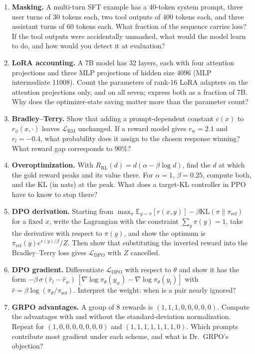 \documentclass[11pt,letterpaper]{article}
\newcommand{\piref}{\pi_{\mathrm{ref}}}
\newcommand{\pit}{\pi_\theta}\newcommand{\KL}{\mathrm{KL}}
\begin{document}
\begin{enumerate}[leftmargin=1.6em,itemsep=6pt]
\item \textbf{Masking.} A multi-turn SFT example has a 40-token system prompt, three user turns of 30 tokens each, two tool outputs of 400 tokens each, and three assistant turns of 60 tokens each. What fraction of the sequence carries loss? If the tool outputs were accidentally unmasked, what would the model learn to do, and how would you detect it at evaluation?
\item \textbf{LoRA accounting.} A 7B model has 32 layers, each with four attention projections and three MLP projections of hidden size 4096 (MLP intermediate 11008). Count the parameters of rank-16 LoRA adapters on the attention projections only, and on all seven; express both as a fraction of 7B. Why does the optimizer-state saving matter more than the parameter count?
\item \textbf{Bradley--Terry.} Show that adding a prompt-dependent constant $c(x)$ to $r_\phi(x,\cdot)$ leaves $\mathcal{L}_{\text{RM}}$ unchanged. If a reward model gives $r_w=2.1$ and $r_l=-0.4$, what probability does it assign to the chosen response winning? What reward gap corresponds to 90\%?
\item \textbf{Overoptimization.} With $R_{\text{RL}}(d)=d(\alpha-\beta\log d)$, find the $d$ at which the gold reward peaks and its value there. For $\alpha=1$, $\beta=0.25$, compute both, and the KL (in nats) at the peak. What does a target-KL controller in PPO have to know to stop there?
\item \textbf{DPO derivation.} Starting from $\max_\pi\mathbb{E}_{y\sim\pi}[r(x,y)]-\beta\KL(\pi\|\piref)$ for a fixed $x$, write the Lagrangian with the constraint $\sum_y\pi(y)=1$, take the derivative with respect to $\pi(y)$, and show the optimum is $\piref(y)e^{r(y)/\beta}/Z$. Then show that substituting the inverted reward into the Bradley--Terry loss gives $\mathcal{L}_{\text{DPO}}$ with $Z$ cancelled.
\item \textbf{DPO gradient.} Differentiate $\mathcal{L}_{\text{DPO}}$ with respect to $\theta$ and show it has the form $-\beta\,\sigma(\hat r_l-\hat r_w)\,[\nabla\log\pit(y_w)-\nabla\log\pit(y_l)]$ with $\hat r=\beta\log(\pit/\piref)$. Interpret the weight: when is a pair nearly ignored?
\item \textbf{GRPO advantages.} A group of 8 rewards is $(1,1,1,0,0,0,0,0)$. Compute the advantages with and without the standard-deviation normalization. Repeat for $(1,0,0,0,0,0,0,0)$ and $(1,1,1,1,1,1,1,0)$. Which prompts contribute most gradient under each scheme, and what is Dr.\ GRPO's objection?

\end{enumerate}
\end{document}
